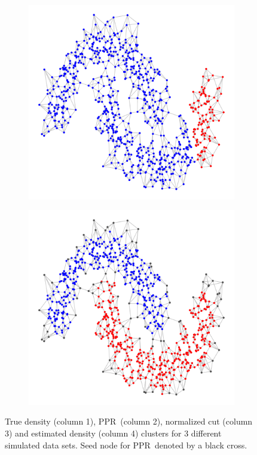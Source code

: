\documentclass{article}
\newcommand{\1}{\mathbf{1}}
\newcommand{\pprspace}{{\sc PPR~}}
\theoremstyle{aldenthm}
\theoremstyle{aldenrmrk}
\begin{document}
\begin{figure}
\begin{adjustbox}{minipage=\linewidth}
\begin{subfigure}{.24\linewidth}
			\caption{}
		\end{subfigure}
		\begin{subfigure}{.24\linewidth}
			\includegraphics[width=\linewidth]{example2plots/row3_conductance_cluster}
			\caption{}
		\end{subfigure}
		\begin{subfigure}{.24\linewidth}
			\includegraphics[width=\linewidth]{example2plots/row3_density_cluster}
			\caption{}
		\end{subfigure}
		\caption{True density (column 1), \pprspace (column 2), normalized cut (column 3) and estimated density (column 4) clusters for 3 different simulated data sets. Seed node for \pprspace denoted by a black cross.}
		\label{fig:fig2}
	\end{adjustbox}
\end{figure}
\end{document}
